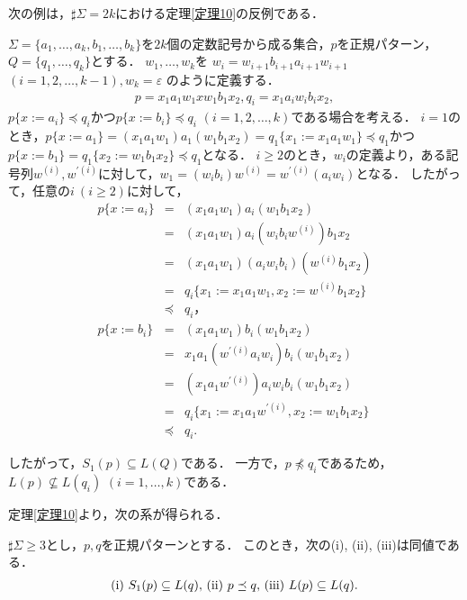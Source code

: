 次の例は，$\sharp \Sigma = 2k$における定理\ref{定理10}の反例である．
\begin{ex}\label{例題1}
$\Sigma = \{ a_{1}, \ldots , a_{k}, b_{1}, \ldots , b_{k} \}$を$2k$個の定数記号から成る集合，$p$を正規パターン，$Q = \{ q_{1}, \ldots , q_{k} \}$とする．
$w_{1}, \ldots , w_{k}$を
$w_{i} = w_{i+1}b_{i+1}a_{i+1}w_{i+1}$ $(i = 1,2, \ldots , k-1), w_{k} = \varepsilon$
のように定義する．				
\begin{eqnarray*}
p = x_{1}a_{1}w_{1}xw_{1}b_{1}x_{2},
q_{i} = x_{1}a_{i}w_{i}b_{i}x_{2},
\end{eqnarray*}
$p \{ x:=a_{i} \} \preceq q_{i}$かつ$p \{ x:=b_{i} \} \preceq q_{i}$ $(i = 1,2, \ldots , k)$である場合を考える．
$i=1$のとき，$p \{ x:=a_{1} \} = (x_{1}a_{1}w_{1})a_{1}(w_{1}b_{1}x_{2}) = q_{1} \{ x_{1} := x_{1}a_{1}w_{1} \} \preceq q_{1}$かつ$p \{ x:=b_{1} \} = q_{1} \{ x_{2} := w_{1}b_{1}x_{2} \} \preceq q_{1}$となる．
$i \ge 2$のとき，$w_{i}$の定義より，ある記号列$w^{(i)},w^{\prime (i)}$に対して，$w_{1} = (w_{i}b_{i})w^{(i)} = w^{\prime (i)}(a_{i}w_{i})$となる．
したがって，任意の$i~(i \ge 2)$に対して， 
\begin{eqnarray*}
p \{ x:=a_{i} \} & = & (x_{1}a_{1}w_{1})a_{i}(w_{1}b_{1}x_{2})\\
& = & (x_{1}a_{1}w_{1})a_{i}(w_{i}b_{i}w^{(i)})b_{1}x_{2}\\
& = & (x_{1}a_{1}w_{1})(a_{i}w_{i}b_{i})(w^{(i)}b_{1}x_{2})\\
& = & q_{i} \{ x_{1} := x_{1}a_{1}w_{1}, x_{2} := w^{(i)}b_{1}x_{2} \}\\
& \preceq & q_{i}，\\
p \{ x:=b_{i} \} & = & (x_{1}a_{1}w_{1})b_{i}(w_{1}b_{1}x_{2})\\
& = & x_{1}a_{1}(w^{\prime (i)}a_{i}w_{i})b_{i}(w_{1}b_{1}x_{2}) \\
& = & (x_{1}a_{1}w^{\prime (i)})a_{i}w_{i}b_{i}(w_{1}b_{1}x_{2}) \\
& = & q_{i} \{ x_{1} := x_{1}a_{1}w^{\prime (i)}, x_{2} := w_{1}b_{1}x_{2} \}\\
& \preceq & q_{i}.
\end{eqnarray*}

したがって，$S_{1}(p) \subseteq L(Q)$である． 
一方で，$p \not \preceq q_{i}$であるため，
$L(p) \not \subseteq L(q_{i})$ $(i=1, \ldots , k)$である．
\end{ex}

定理\ref{定理10}より，次の系が得られる．
\begin{col}
$\sharp \Sigma \ge 3$とし，$p,q$を正規パターンとする．
このとき，次の{\rm (i), (ii), (iii)}は同値である．
\[
\begin{tabular}{ll}
$(\mathrm{i})$ $S_{1}(p) \subseteq L(q),$
$(\mathrm{ii})$ $p \preceq q,$
$(\mathrm{iii})$ $L(p) \subseteq L(q).$
\end{tabular}
\]
\end{col}